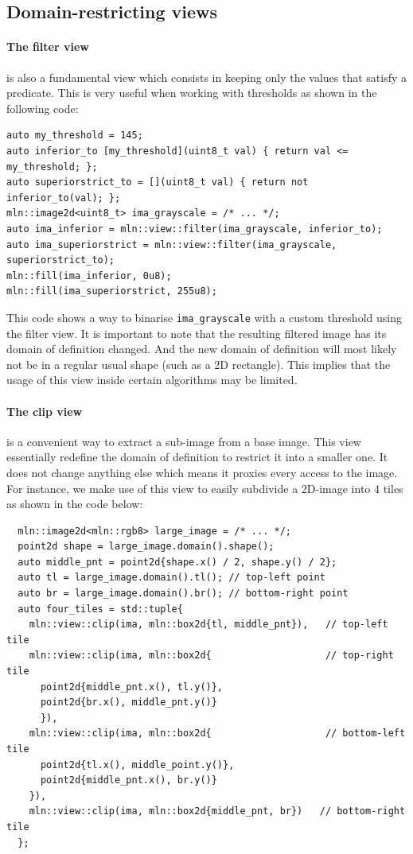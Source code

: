 \subsection{Domain-restricting views}

\paragraph{The filter view} is also a fundamental view which consists in keeping only the values that satisfy a
predicate. This is very useful when working with thresholds as shown in the following code:
\begin{verbatim}
auto my_threshold = 145;
auto inferior_to [my_threshold](uint8_t val) { return val <= my_threshold; };
auto superiorstrict_to = [](uint8_t val) { return not inferior_to(val); };
mln::image2d<uint8_t> ima_grayscale = /* ... */;
auto ima_inferior = mln::view::filter(ima_grayscale, inferior_to);
auto ima_superiorstrict = mln::view::filter(ima_grayscale, superiorstrict_to);
mln::fill(ima_inferior, 0u8);
mln::fill(ima_superiorstrict, 255u8);
\end{verbatim}
This code shows a way to binarise \texttt{ima\_grayscale} with a custom threshold using the filter view. It is important
to note that the resulting filtered image has its domain of definition changed. And the new domain of definition will
most likely not be in a regular usual shape (such as a 2D rectangle). This implies that the usage of this view inside
certain algorithms may be limited.

\paragraph{The clip view} is a convenient way to extract a sub-image from a base image. This view essentially redefine
the domain of definition to restrict it into a smaller one. It does not change anything else which means it proxies
every access to the image. For instance, we make use of this view to easily subdivide a 2D-image into 4 tiles as shown
in the code below:
\begin{verbatim}
  mln::image2d<mln::rgb8> large_image = /* ... */;
  point2d shape = large_image.domain().shape();
  auto middle_pnt = point2d{shape.x() / 2, shape.y() / 2};
  auto tl = large_image.domain().tl(); // top-left point
  auto br = large_image.domain().br(); // bottom-right point
  auto four_tiles = std::tuple{
    mln::view::clip(ima, mln::box2d{tl, middle_pnt}),   // top-left tile
    mln::view::clip(ima, mln::box2d{                    // top-right tile
      point2d{middle_pnt.x(), tl.y()},
      point2d{br.x(), middle_pnt.y()}
      }),
    mln::view::clip(ima, mln::box2d{                    // bottom-left tile
      point2d{tl.x(), middle_point.y()},
      point2d{middle_pnt.x(), br.y()}
    }),
    mln::view::clip(ima, mln::box2d{middle_pnt, br})   // bottom-right tile
  };
\end{verbatim}

